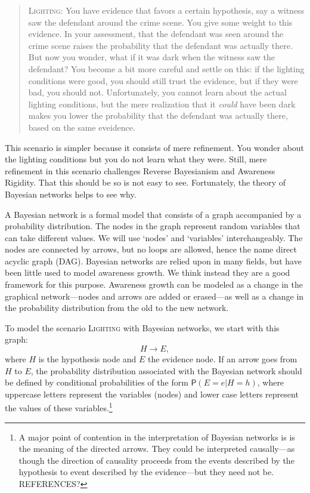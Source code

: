 \documentclass[
  11pt,
  dvipsnames,enabledeprecatedfontcommands]{scrartcl}
\newcommand{\pr}[1]{\ensuremath{\mathsf{P}(#1)}}
\begin{document}
\begin{quote}
\textsc{Lighting:} You have evidence that favors a certain hypothesis,
say a witness saw the defendant around the crime scene. You give some
weight to this evidence. In your assessment, that the defendant was seen
around the crime scene raises the probability that the defendant was
actually there. But now you wonder, what if it was dark when the witness
saw the defendant? You become a bit more careful and settle on this: if
the lighting conditions were good, you should still trust the evidence,
but if they were bad, you should not. Unfortunately, you cannot learn
about the actual lighting conditions, but the mere realization that it
\textit{could} have been dark makes you lower the probability that the
defendant was actually there, based on the same eveidence.
\end{quote}

\noindent This scenario is simpler because it consists of mere
refinement. You wonder about the lighting conditions but you do not
learn what they were. Still, mere refinement in this scenario challenges
Reverse Bayesianism and Awareness Rigidity. That this should be so is
not easy to see. Fortunately, the theory of Bayesian networks helps to
see why.

A Bayesian network is a formal model that consists of a graph
accompanied by a probability distribution. The nodes in the graph
represent random variables that can take different values. We will use
`nodes' and `variables' interchangeably. The nodes are connected by
arrows, but no loops are allowed, hence the name direct acyclic graph
(DAG). Bayesian networks are relied upon in many fields, but have been
little used to model awareness growth. We think instead they are a good
framework for this purpose. Awareness growth can be modeled as a change
in the graphical network---nodes and arrows are added or erased---as
well as a change in the probability distribution from the old to the new
network.

To model the scenario \textsc{Lighting} with Bayesian networks, we start
with this graph: \[H \rightarrow E,\] where \(H\) is the hypothesis node
and \(E\) the evidence node. If an arrow goes from \(H\) to \(E\), the
probability distribution associated with the Bayesian network should be
defined by conditional probabilities of the form \(\pr{E=e \vert H=h}\),
where uppercase letters represent the variables (nodes) and lower case
letters represent the values of these variables.\footnote{A major point
  of contention in the interpretation of Bayesian networks is is the
  meaning of the directed arrows. They could be interpreted
  causally---as though the direction of causality proceeds from the
  events described by the hypothesis to event described by the
  evidence---but they need not be. REFERENCES?}
\end{document}
